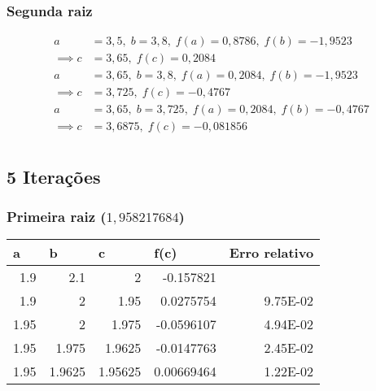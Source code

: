 \documentclass[12pt]{article}
\begin{document}
\subsubsection{Segunda raiz}
\begin{align*}
    a &= 3,5,\; b =3,8,\; f(a) = 0,8786,\; f(b) = -1,9523 \\
    \implies c &= 3,65,\; f(c) = 0,2084 \\
    a &= 3,65,\; b =3,8,\; f(a) = 0,2084,\; f(b) = -1,9523 \\
    \implies c &= 3,725,\; f(c) = -0,4767 \\
    a &= 3,65,\; b =3,725,\; f(a) = 0,2084,\; f(b) = -0,4767 \\
    \implies c &= 3,6875,\; f(c) = -0,081856 \\
\end{align*}

\subsection{5 Iterações}
\subsubsection{Primeira raiz (\(1,958217684\))}

\begin{table}[H]
\centering
\begin{tabular}{@{}rrrrr@{}}
\toprule
\multicolumn{1}{l}{a} & \multicolumn{1}{l}{b} & \multicolumn{1}{l}{c} & \multicolumn{1}{l}{f(c)} & \multicolumn{1}{l}{Erro relativo} \\ \midrule
1.9                   & 2.1                   & 2                     & -0.157821                & \multicolumn{1}{l}{}              \\
1.9                   & 2                     & 1.95                  & 0.0275754                & 9.75E-02                          \\
1.95                  & 2                     & 1.975                 & -0.0596107               & 4.94E-02                          \\
1.95                  & 1.975                 & 1.9625                & -0.0147763               & 2.45E-02                          \\
1.95                  & 1.9625                & 1.95625               & 0.00669464               & 1.22E-02                          \\ \bottomrule
\end{tabular}
\end{table}
\end{document}
